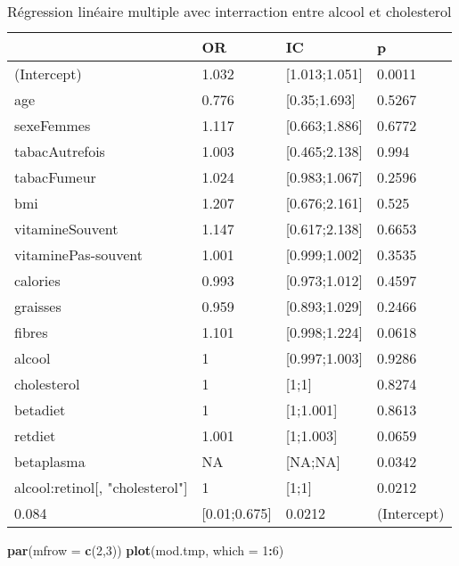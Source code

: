 \documentclass[]{article}
\newenvironment{Shaded}{\begin{snugshade}}{\end{snugshade}}
\newcommand{\KeywordTok}[1]{\textcolor[rgb]{0.13,0.29,0.53}{\textbf{#1}}}
\newcommand{\DataTypeTok}[1]{\textcolor[rgb]{0.13,0.29,0.53}{#1}}
\newcommand{\DecValTok}[1]{\textcolor[rgb]{0.00,0.00,0.81}{#1}}
\newcommand{\OperatorTok}[1]{\textcolor[rgb]{0.81,0.36,0.00}{\textbf{#1}}}
\newcommand{\NormalTok}[1]{#1}
\begin{document}
\begin{table}

\caption{\label{tab:unnamed-chunk-91}Régression linéaire multiple avec interraction entre alcool et cholesterol}
\centering
\begin{tabular}[t]{l|l|l|l}
\hline
  & OR & IC & p\\
\hline
\rowcolor[HTML]{BBD2E1}  (Intercept) & 1.032 & [1.013;1.051] & 0.0011\\
\hline
age & 0.776 & [0.35;1.693] & 0.5267\\
\hline
\rowcolor[HTML]{BBD2E1}  sexeFemmes & 1.117 & [0.663;1.886] & 0.6772\\
\hline
tabacAutrefois & 1.003 & [0.465;2.138] & 0.994\\
\hline
\rowcolor[HTML]{BBD2E1}  tabacFumeur & 1.024 & [0.983;1.067] & 0.2596\\
\hline
bmi & 1.207 & [0.676;2.161] & 0.525\\
\hline
\rowcolor[HTML]{BBD2E1}  vitamineSouvent & 1.147 & [0.617;2.138] & 0.6653\\
\hline
vitaminePas-souvent & 1.001 & [0.999;1.002] & 0.3535\\
\hline
\rowcolor[HTML]{BBD2E1}  calories & 0.993 & [0.973;1.012] & 0.4597\\
\hline
graisses & 0.959 & [0.893;1.029] & 0.2466\\
\hline
\rowcolor[HTML]{BBD2E1}  fibres & 1.101 & [0.998;1.224] & 0.0618\\
\hline
alcool & 1 & [0.997;1.003] & 0.9286\\
\hline
\rowcolor[HTML]{BBD2E1}  cholesterol & 1 & [1;1] & 0.8274\\
\hline
betadiet & 1 & [1;1.001] & 0.8613\\
\hline
\rowcolor[HTML]{BBD2E1}  retdiet & 1.001 & [1;1.003] & 0.0659\\
\hline
betaplasma & NA & [NA;NA] & 0.0342\\
\hline
\rowcolor[HTML]{BBD2E1}  alcool:retinol[, "cholesterol"] & 1 & [1;1] & 0.0212\\
\hline
0.084 & [0.01;0.675] & 0.0212 & (Intercept)\\
\hline
\end{tabular}
\end{table}

\begin{Shaded}
\begin{Highlighting}[]
\KeywordTok{par}\NormalTok{(}\DataTypeTok{mfrow =} \KeywordTok{c}\NormalTok{(}\DecValTok{2}\NormalTok{,}\DecValTok{3}\NormalTok{))}
\KeywordTok{plot}\NormalTok{(mod.tmp, }\DataTypeTok{which =} \DecValTok{1}\OperatorTok{:}\DecValTok{6}\NormalTok{)}
\end{Highlighting}
\end{Shaded}
\end{document}
